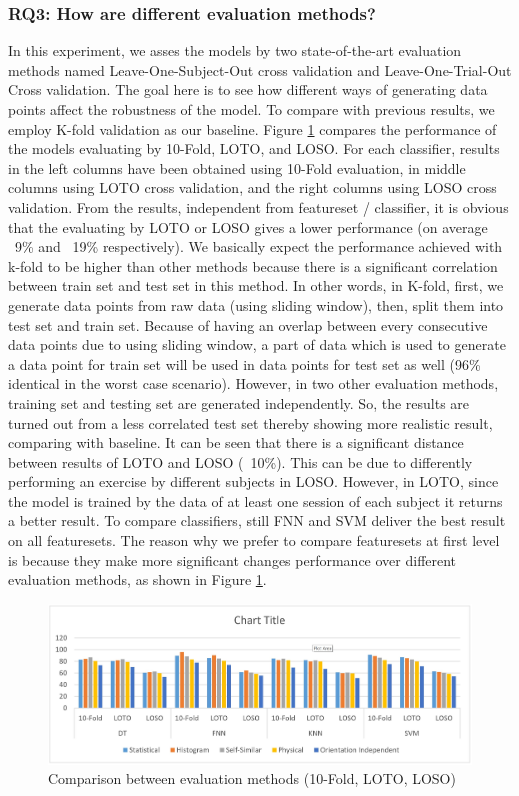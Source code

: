 \documentclass[journal,article,submit,moreauthors,pdftex]{Definitions/mdpi}
\begin{document}
\subsubsection{RQ3: How are different evaluation methods?}
In this experiment, we asses the models by two state-of-the-art evaluation methods named Leave-One-Subject-Out cross validation and Leave-One-Trial-Out Cross validation. The goal here is to see how different ways of generating data points affect the robustness of the model. To compare with previous results, we employ K-fold validation as our baseline. Figure \ref{fig:evaluation_comparison} compares the performance of the models evaluating by 10-Fold, LOTO, and LOSO. For each classifier, results in the left columns have been obtained using 10-Fold evaluation, in middle columns using LOTO cross validation, and the right columns using LOSO cross validation. From the results, independent from featureset / classifier, it is obvious that the evaluating by LOTO or LOSO gives a lower performance (on average ~9\% and ~19\% respectively).
We basically expect the performance achieved with k-fold to be higher than other methods because there is a significant correlation between train set and test set in this method. In other words, in K-fold, first, we generate data points from raw data (using sliding window), then, split them into test set and train set. Because of having an overlap between every consecutive data points due to using sliding window, a part of data which is used to generate a data point for train set will be used in data points for test set as well (96\% identical in the worst case scenario). However, in two other evaluation methods, training set and testing set are generated independently. So, the results are turned out from a less correlated test set thereby showing more realistic result, comparing with baseline. 
It can be seen that there is a significant distance between results of LOTO and LOSO (~10\%). This can be due to differently performing an exercise by different subjects in LOSO. However, in LOTO, since the model is trained by the data of at least one session of each subject it returns a better result. To compare classifiers, still FNN and SVM deliver the best result on all featuresets. The reason why we prefer to compare featuresets at first level is because they make more significant changes performance over different evaluation methods, as shown in Figure \ref{fig:evaluation_comparison}.

 
\begin{figure}[H]
	\centering
	\includegraphics[width=14 cm]{Definitions/images/evaluation_comparison.jpg}
	\caption{Comparison between evaluation methods (10-Fold, LOTO, LOSO)}
	\label{fig:evaluation_comparison}
\end{figure} 
\end{document}

